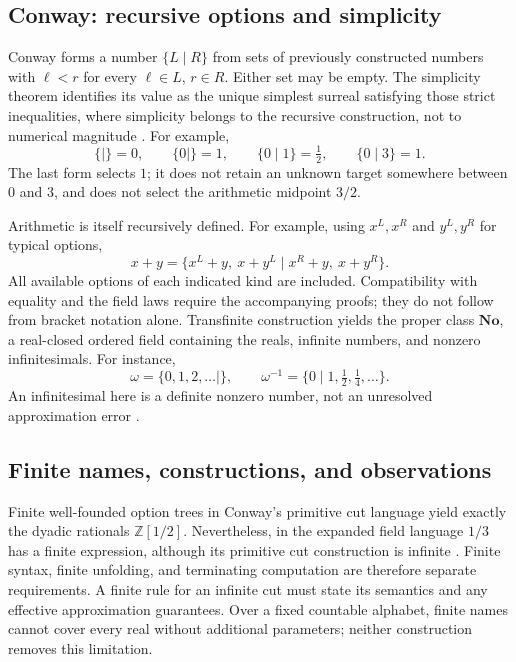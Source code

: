 \subsection{Conway: recursive options and simplicity}
\label{subsec:p0-conway-cuts}

Conway forms a number $\{L\mid R\}$ from sets of previously constructed
numbers with $\ell<r$ for every $\ell\in L$, $r\in R$.  Either set may be
empty.  The simplicity theorem identifies its value as the unique simplest
surreal satisfying those strict inequalities, where simplicity belongs to
the recursive construction, not to numerical magnitude
\cite[Chapters 0--2]{Conway1976NumbersGames}.  For example,
\[
  \{\mid\}=0,\qquad \{0\mid\}=1,\qquad
  \{0\mid1\}=\tfrac12,\qquad \{0\mid3\}=1.
\]
The last form selects $1$; it does not retain an unknown target somewhere
between $0$ and $3$, and does not select the arithmetic midpoint $3/2$.

Arithmetic is itself recursively defined.  For example, using $x^L,x^R$
and $y^L,y^R$ for typical options,
\[
 x+y=\{x^L+y,\ x+y^L\mid x^R+y,\ x+y^R\}.
\]
All available options of each indicated kind are included.  Compatibility
with equality and the field laws require the accompanying proofs; they do
not follow from bracket notation alone.  Transfinite construction yields
the proper class $\mathbf{No}$, a real-closed ordered field containing the
reals, infinite numbers, and nonzero infinitesimals.  For instance,
\[
 \omega=\{0,1,2,\ldots\mid\},\qquad
 \omega^{-1}=\{0\mid1,\tfrac12,\tfrac14,\ldots\}.
\]
An infinitesimal here is a definite nonzero number, not an unresolved
approximation error \cite{Ehrlich2011ConwayNames}.

\subsection{Finite names, constructions, and observations}
\label{subsec:p0-cut-representation-boundaries}

Finite well-founded option trees in Conway's primitive cut language yield
exactly the dyadic rationals $\mathbb Z[1/2]$.  Nevertheless, in the expanded
field language $1/3$ has a finite expression, although its primitive cut
construction is infinite \cite[Chapter 2]{Conway1976NumbersGames}.
Finite syntax, finite unfolding, and terminating computation are therefore
separate requirements.  A finite rule for an infinite cut must state its
semantics and any effective approximation guarantees.  Over a fixed
countable alphabet, finite names cannot cover every real without additional
parameters; neither construction removes this limitation.

